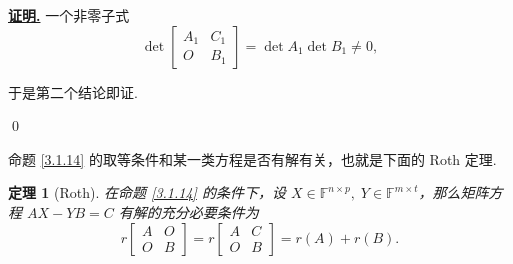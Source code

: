 \documentclass[10pt,openany]{article}
\theoremstyle{thmstyle} %
\newtheorem{theorem}{定理}[subsection]
\theoremstyle{defstyle} %
\theoremstyle{prostyle} %
\theoremstyle{exastyle}
\theoremstyle{remstyle}
\renewenvironment{proof}[1][证明]{\par\underline{\textbf{#1.}} \;\fangsong}{\qed\par}
\newcommand{\F}{\mathbb{F}}
\begin{document}
\begin{proof}
一个非零子式
\[ \det \begin{bmatrix}
	A_1 & C_1 \\ O & B_1
\end{bmatrix} = \det A_1 \det B_1 \neq 0, \]

于是第二个结论即证.

\end{proof}

命题 \ref{3.1.14} 的取等条件和某一类方程是否有解有关，也就是下面的 Roth 定理. 

\begin{theorem}[Roth] \label{3.1.15}
	在命题 \ref{3.1.14} 的条件下，设 \( X \in \F^{n \times p}, \; Y \in \F^{m \times t} \)，那么矩阵方程 \( AX-YB=C \) 有解的充分必要条件为
	\[ r\begin{bmatrix}
		A & O \\ O & B
	\end{bmatrix}= r\begin{bmatrix}
		A & C \\ O & B
	\end{bmatrix}= r(A)+r(B). \]
\end{theorem}
\end{document}
